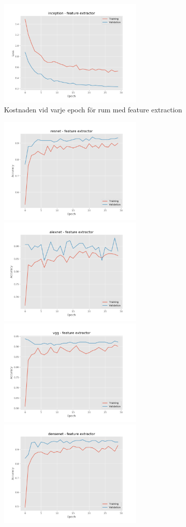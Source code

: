 \documentclass[]{kththesis}
\begin{document}
\begin{figure}[h]
    \includegraphics[width=7cm]{r_l_inception_fe}
    \caption{Kostnaden vid varje epoch för rum med feature extraction}
    \label{fig:r_l_1}
  \end{figure}
  
  \begin{figure}[h]
    \includegraphics[width=7cm]{r_a_resnet_fe}
    \includegraphics[width=7cm]{r_a_alexnet_fe}
    \includegraphics[width=7cm]{r_a_vgg_fe}
    \includegraphics[width=7cm]{r_a_densenet_fe}

\end{figure}
\end{document}
